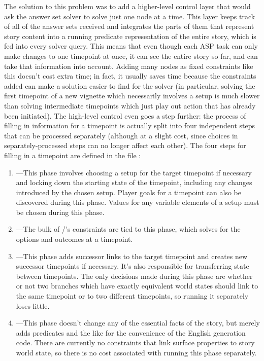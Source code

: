 The solution to this problem was to add a higher-level control layer that would ask the answer set solver to solve just one node at a time.
%
This layer keeps track of all of the answer sets received and integrates the parts of them that represent story content into a running predicate representation of the entire story, which is fed into every solver query.
%
This means that even though each ASP task can only make changes to one timepoint at once, it can see the entire story so far, and can take that information into account.
%
Adding many nodes as fixed constraints like this doesn't cost extra time; in fact, it usually saves time because the constraints added can make a solution easier to find for the solver (in particular, solving the first timepoint of a new vignette which necessarily involves a setup is much slower than solving intermediate timepoints which just play out action that has already been initiated).
%
The high-level control even goes a step further: the process of filling in information for a timepoint is actually split into four independent steps that can be processed separately (although at a slight cost, since choices in separately-processed steps can no longer affect each other).
%
The four steps for filling in a timepoint are defined in the file :
\begin{enumerate}
  \item {}---This phase involves choosing a setup for the target timepoint if necessary and locking down the starting state of the timepoint, including any changes introduced by the chosen setup. Player goals for a timepoint can also be discovered during this phase. Values for any variable elements of a setup must be chosen during this phase.
  \item {}---The bulk of \dunyazad/'s constraints are tied to this phase, which solves for the options and outcomes at a timepoint.
  \item {}---This phase adds successor links to the target timepoint and creates new successor timepoints if necessary. It's also responsible for transferring state between timepoints. The only decisions made during this phase are whether or not two branches which have exactly equivalent world states should link to the same timepoint or to two different timepoints, so running it separately loses little.
  \item {}---This phase doesn't change any of the essential facts of the story, but merely adds  predicates and the like for the convenience of the English generation code. There are currently no constraints that link surface properties to story world state, so there is no cost associated with running this phase separately.
\end{enumerate}

